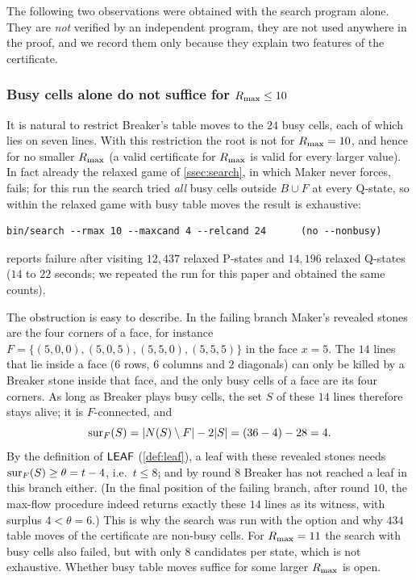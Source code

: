 The following two observations were obtained with the search program alone. They are \emph{not} verified
by an independent program, they are not used anywhere in the proof, and we record them only because they
explain two features of the certificate.

\subsubsection*{Busy cells alone do not suffice for $R_{\max}\le 10$}
It is natural to restrict Breaker's table moves to the $24$ busy cells, each of which lies on seven
lines. With this restriction the root is not \WON{} for $R_{\max}=10$, and hence for no smaller $R_{\max}$ (a
valid certificate for $R_{\max}$ is valid for every larger value). In fact already the relaxed game of
\cref{ssec:search}, in which Maker never forces, fails; for this run the search tried \emph{all} busy cells
outside $B\cup F$ at every Q-state, so within the relaxed game with busy table moves the result is
exhaustive:
\begin{verbatim}
bin/search --rmax 10 --maxcand 4 --relcand 24      (no --nonbusy)
\end{verbatim}
reports failure after visiting $12{,}437$ relaxed P-states and $14{,}196$ relaxed Q-states ($14$ to $22$
seconds; we repeated the run for this paper and obtained the same counts).

The obstruction is easy to describe. In the failing branch Maker's revealed stones are the four corners
of a face, for instance $F=\{(5,0,0),(5,0,5),(5,5,0),(5,5,5)\}$ in the face $x=5$. The $14$ lines that lie
inside a face ($6$ rows, $6$ columns and $2$ diagonals) can only be killed by a Breaker stone inside that
face, and the only busy cells of a face are its four corners. As long as Breaker plays busy cells, the set
$S$ of these $14$ lines therefore stays alive; it is $F$-connected, and
\[
\operatorname{sur}_F(S)=|N(S)\setminus F|-2|S| = (36-4)-28 = 4 .
\]
By the definition of $\mathsf{LEAF}$ (\cref{def:leaf}), a leaf with these revealed stones needs
$\operatorname{sur}_F(S)\ge\theta=t-4$, i.e.\ $t\le 8$; and by round $8$ Breaker has not reached a leaf in this branch
either. (In the final position of the failing branch, after round $10$, the max-flow procedure indeed
returns exactly these $14$ lines as its witness, with surplus $4<\theta=6$.) This is why the search was run
with the option  and why $434$ table moves of the certificate are non-busy cells. For
$R_{\max}=11$ the search with busy cells also failed, but with only $8$ candidates per state, which is not
exhaustive. Whether busy table moves suffice for some larger $R_{\max}$ is open.

